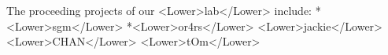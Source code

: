 The proceeding projects of our <Lower>lab</Lower> include:
   *<Lower>sgm</Lower>
   *<Lower>or4rs</Lower>
<Lower>jackie</Lower><Lower>CHAN</Lower>
<Lower>tOm</Lower>
